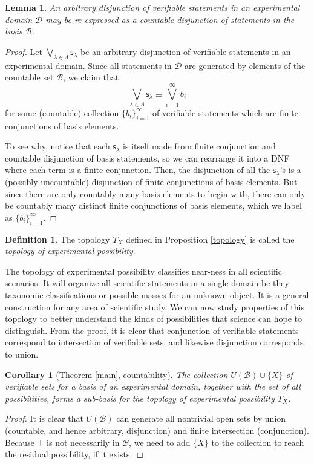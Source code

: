\documentclass[psamsfonts]{amsart}
\newtheorem{cor}[thm]{Corollary}
\newtheorem{lem}[thm]{Lemma}
\theoremstyle{definition}
\newtheorem{defn}[thm]{Definition}
\theoremstyle{remark}
\numberwithin{equation}{section}
\def\tautology{\top}
\def\bigOR{\bigvee}
\newcommand{\stmt}[1][s] {\mathsf{#1}}
\newcommand{\edomain}[1][D] {\mathcal{#1}}
\newcommand{\basis}[1][B] {\mathcal{#1}} %
\begin{document}
\begin{lem}\label{countable_disjunction}
An arbitrary disjunction of verifiable statements in an experimental domain $\edomain$ may be re-expressed as a countable disjunction of statements in the basis $\basis$.
\end{lem}
\begin{proof}
Let $\bigOR\limits_{\lambda\in\Lambda}\stmt_{\lambda}$ be an arbitrary disjunction of verifiable statements in an experimental domain. Since all statements in $\edomain$ are generated by elements of the countable set $\basis$, we claim that $$\bigOR\limits_{\lambda\in\Lambda}\stmt_{\lambda} \equiv \bigOR\limits_{i=1}^{\infty}b_i$$ for some (countable) collection $\{b_i\}_{i=1}^{\infty}$ of verifiable statements which are finite conjunctions of basis elements. 

To see why, notice that each $\stmt_{\lambda}$ is itself made from finite conjunction and countable disjunction of basis statements, so we can rearrange it into a DNF where each term is a finite conjunction. Then, the disjunction of all the $\stmt_{\lambda}$'s is a (possibly uncountable) disjunction of finite conjunctions of basis elements. But since there are only countably many basis elements to begin with, there can only be countably many distinct finite conjunctions of basis elements, which we label as $\{b_i\}_{i=1}^{\infty}$. 
\end{proof}

\begin{defn}
The topology $T_X$ defined in Proposition \ref{topology} is called the \emph{topology of experimental possibility}.
\end{defn}

The topology of experimental possibility classifies near-ness in all scientific scenarios. It will organize all scientific statements in a single domain be they taxonomic classifications or possible masses for an unknown object. It is a general construction for any area of scientific study. We can now study properties of this topology to better understand the kinds of possibilities that science can hope to distinguish. From the proof, it is clear that conjunction of verifiable statements correspond to intersection of verifiable sets, and likewise disjunction corresponds to union. 

\begin{cor}[Theorem \ref{main}, countability]
The collection $U(\basis)\cup\{X\}$ of verifiable sets for a basis of an experimental domain, together with the set of all possibilities, forms a sub-basis for the topology of experimental possibility $T_X$.
\end{cor}
\begin{proof}
It is clear that $U(\basis)$ can generate all nontrivial open sets by union (countable, and hence arbitrary, disjunction) and finite intersection (conjunction). Because $\tautology$ is not necessarily in $\basis$, we need to add $\{X\}$ to the collection to reach the residual possibility, if it exists. 
\end{proof}
\end{document}
